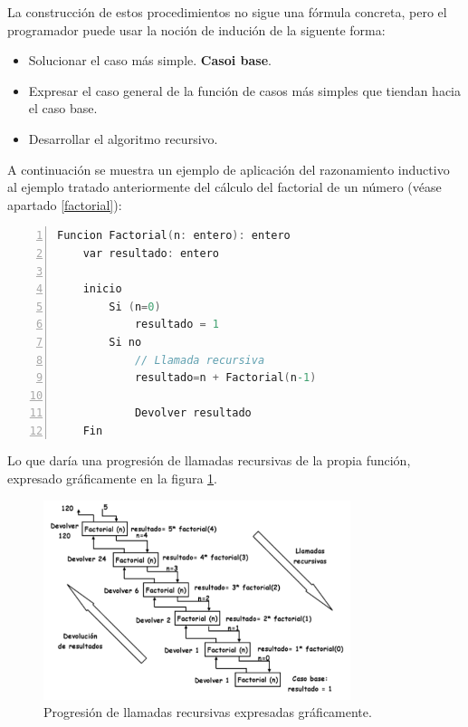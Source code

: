 \documentclass[a4paper, 11pt, titlepage]{article}
\begin{document}
        La construcción de estos procedimientos no sigue una fórmula concreta, pero el programador 
        puede usar la noción de indución de la siguente forma:

        \begin{itemize}
            \item Solucionar el caso más simple. \textbf{Casoi base}.
            \item Expresar el caso general de la función de casos más simples que tiendan hacia el caso base.
            \item Desarrollar el algoritmo recursivo.
        \end{itemize}
        
        A continuación se muestra un ejemplo de aplicación del razonamiento inductivo al ejemplo tratado 
        anteriormente del cálculo del factorial de un número (véase apartado \ref{factorial}):

        \begin{lstlisting}[language=C,numbers=left]
    Funcion Factorial(n: entero): entero 
    var resultado: entero

    inicio
        Si (n=0)
            resultado = 1
        Si no
            // Llamada recursiva
            resultado=n + Factorial(n-1) 
            
            Devolver resultado
    Fin\end{lstlisting}

        Lo que daría una progresión de llamadas recursivas de la propia función, expresado gráficamente en
        la figura \ref{factorial4}.

        \begin{figure}[htp]
            \centering
            \includegraphics[width=0.8\textwidth]{resources/recursividad02.png}
            \caption{Progresión de llamadas recursivas expresadas gráficamente.}
            \label{factorial4}
        \end{figure}
\end{document}
